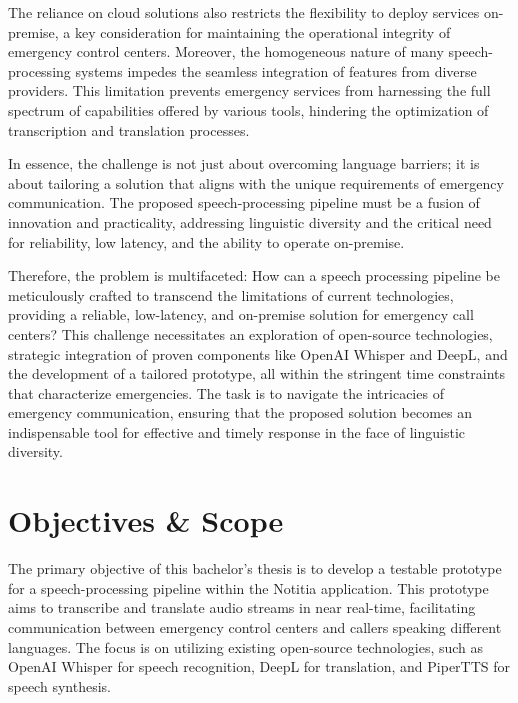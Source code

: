 The reliance on cloud solutions also restricts the flexibility to deploy services on-premise, a key consideration for 
maintaining the operational integrity of emergency control centers. Moreover, the homogeneous nature of many 
speech-processing systems impedes the seamless integration of features from diverse providers. This limitation prevents 
emergency services from harnessing the full spectrum of capabilities offered by various tools, hindering the 
optimization of transcription and translation processes.

In essence, the challenge is not just about overcoming language barriers; it is about tailoring a solution that aligns 
with the unique requirements of emergency communication. The proposed speech-processing pipeline must be a fusion of 
innovation and practicality, addressing linguistic diversity and the critical need for reliability, low 
latency, and the ability to operate on-premise.

Therefore, the problem is multifaceted: How can a speech processing pipeline be meticulously crafted to 
transcend the limitations of current technologies, providing a reliable, low-latency, and on-premise solution for 
emergency call centers? This challenge necessitates an exploration of open-source technologies, strategic integration 
of proven components like OpenAI Whisper and DeepL, and the development of a tailored prototype, all within the 
stringent time constraints that characterize emergencies. The task is to navigate the intricacies of emergency 
communication, ensuring that the proposed solution becomes an indispensable tool for effective and timely response in 
the face of linguistic diversity.



\section{Objectives \& Scope}

The primary objective of this bachelor's thesis is to develop a testable prototype for a speech-processing pipeline 
within the Notitia application. This prototype aims to transcribe and translate audio streams in near real-time, 
facilitating communication between emergency control centers and callers speaking different languages. The focus is on 
utilizing existing open-source technologies, such as OpenAI Whisper for speech recognition, DeepL for translation, and 
PiperTTS for speech synthesis.

